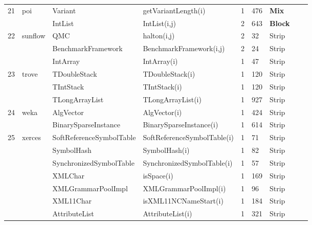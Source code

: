 \documentclass[runningheads,a4paper]{llncs}
\begin{document}
\begin{table}[h]
{\begin{tabular}{|l|l|l|l|l|l|l|l|l|}
21	&	poi			& Variant				& getVariantLength(i)		& 1			& 476	& {\bf Mix}  										\\ 
	&				& IntList					& IntList(i,j)				& 2			& 643	& {\bf Block} 										\\ 	
22	&	sunflow		& QMC					& halton(i,j)				& 2			& 32	& Strip  										\\ 
	&				& BenchmarkFramework	& BenchmarkFramework(i,j) & 2		& 24	& Strip   										\\ 
	&				& IntArray				& IntArray(i)				& 1			& 47	& Strip 										\\ 	
23	&	trove		& TDoubleStack			& TDoubleStack(i)		& 1			& 120	& Strip  										\\ 
	&				& TIntStack				& TIntStack(i)			& 1			& 120	& Strip  										\\ 
	&				& TLongArrayList			& TLongArrayList(i)		& 1			& 927	& Strip  										\\ 
24	&	weka		& AlgVector				& AlgVector(i)			& 1			& 424	& Strip  										\\ 
	&				& BinarySparseInstance	& BinarySparseInstance(i)  & 1			& 614	& Strip 										\\ 
25	&	xerces		& SoftReferenceSymbolTable& SoftReferenceSymbolTable(i) & 1	& 71	& Strip  										\\ 
	&				& SymbolHash			& SymbolHash(i)			& 1			& 82	& Strip 										\\ 
	&				& SynchronizedSymbolTable& SynchronizedSymbolTable(i) & 1	& 57	& Strip  										\\ 
	&				& XMLChar				& isSpace(i)				& 1			& 169	& Strip 										\\ 
	&				& XMLGrammarPoolImpl	& XMLGrammarPoolImpl(i)	& 1			& 96	& Strip   										\\ 
	&				& XML11Char			& isXML11NCNameStart(i)	& 1			& 184	& Strip  										\\ 
	&				& AttributeList			& AttributeList(i)			& 1			& 321	& Strip  										\\ 
\hline
\end{tabular}
}
\bigskip
\label{table:packages}
\end{table}
\end{document}
